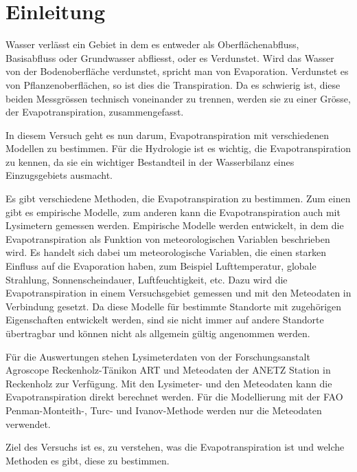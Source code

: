 \section{Einleitung}

Wasser verlässt ein Gebiet in dem es entweder als Oberflächenabfluss, Basisabfluss oder Grundwasser abfliesst, oder es Verdunstet. Wird das Wasser von der Bodenoberfläche verdunstet, spricht man von Evaporation. Verdunstet es von Pflanzenoberflächen, so ist dies die Transpiration. Da es schwierig ist, diese beiden Messgrössen technisch voneinander zu trennen, werden sie zu einer Grösse, der Evapotranspiration, zusammengefasst.

In diesem Versuch geht es nun darum, Evapotranspiration mit verschiedenen Modellen zu bestimmen. Für die Hydrologie ist es wichtig, die Evapotranspiration zu kennen, da sie ein wichtiger Bestandteil in der Wasserbilanz eines Einzugsgebiets ausmacht.

Es gibt verschiedene Methoden, die Evapotranspiration zu bestimmen. Zum einen gibt es empirische Modelle, zum anderen kann die Evapotranspiration auch mit Lysimetern gemessen werden. Empirische Modelle werden entwickelt, in dem die Evapotranspiration als Funktion von meteorologischen Variablen beschrieben wird. Es handelt sich dabei um meteorologische Variablen, die einen starken Einfluss auf die Evaporation haben, zum Beispiel Lufttemperatur, globale Strahlung, Sonnenscheindauer, Luftfeuchtigkeit, etc. Dazu wird die Evapotranspiration in einem Versuchsgebiet gemessen und mit den Meteodaten in Verbindung gesetzt. Da diese Modelle für bestimmte Standorte mit zugehörigen Eigenschaften entwickelt werden, sind sie nicht immer auf andere Standorte übertragbar und können nicht als allgemein gültig angenommen werden.

Für die Auswertungen stehen Lysimeterdaten von der Forschungsanstalt Agroscope Reckenholz-Tänikon ART und Meteodaten der ANETZ Station in Reckenholz zur Verfügung. Mit den Lysimeter- und den Meteodaten kann die Evapotranspiration direkt berechnet werden. Für die Modellierung mit der FAO Penman-Monteith-, Turc- und Ivanov-Methode werden nur die Meteodaten verwendet.

Ziel des Versuchs ist es, zu verstehen, was die Evapotranspiration ist und welche Methoden es gibt, diese zu bestimmen.